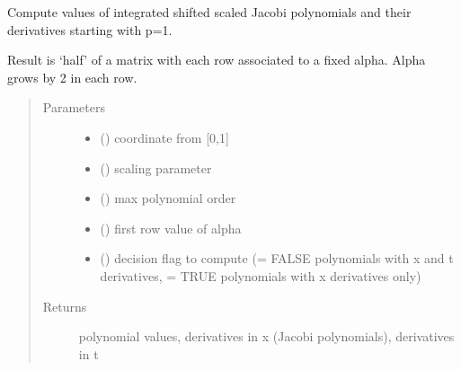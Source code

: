 \documentclass[letterpaper,10pt,english]{sphinxmanual}
\begin{document}
\begin{fulllineitems}
\label{\detokenize{petgem/hvfem:petgem.hvfem.PolyIJacobi}}
Compute values of integrated shifted scaled Jacobi polynomials and their derivatives starting with p=1.

Result is ‘half’ of a  matrix with each row  associated to a fixed alpha.
Alpha grows by 2 in each row.
\begin{quote}\begin{description}
\item[{Parameters}] \leavevmode\begin{itemize}
\item {} 
 () \textendash{} coordinate from {[}0,1{]}

\item {} 
 () \textendash{} scaling parameter

\item {} 
 () \textendash{} max polynomial order

\item {} 
 () \textendash{} first row value of alpha

\item {} 
 () \textendash{} decision flag to compute (= FALSE polynomials with x and t derivatives, = TRUE  polynomials with x derivatives only)

\end{itemize}

\item[{Returns}] \leavevmode
polynomial values, derivatives in x (Jacobi polynomials), derivatives in t

\end{description}\end{quote}

\end{fulllineitems}

\end{document}
